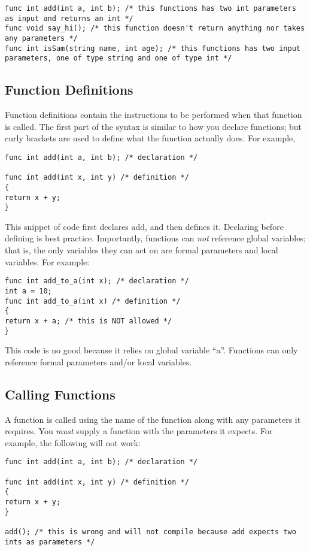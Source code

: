 \documentclass{article}
\begin{document}
\begin{lstlisting}
func int add(int a, int b); /* this functions has two int parameters as input and returns an int */
func void say_hi(); /* this function doesn't return anything nor takes any parameters */
func int isSam(string name, int age); /* this functions has two input parameters, one of type string and one of type int */

\end{lstlisting}

\subsection{Function Definitions}
Function definitions contain the instructions to be performed when that function is called. The first part of the syntax is similar to how you declare functions; but curly brackets are used to define what the function actually does. For example, 

\begin{lstlisting}
func int add(int a, int b); /* declaration */

func int add(int x, int y) /* definition */
{
return x + y;
}
\end{lstlisting}

This snippet of code first declares add, and then defines it. Declaring before defining is best practice. Importantly, functions can \emph{not} reference global variables; that is, the only variables they can act on are formal parameters and local variables. For example:

\begin{lstlisting}
func int add_to_a(int x); /* declaration */
int a = 10;
func int add_to_a(int x) /* definition */
{
return x + a; /* this is NOT allowed */
}
\end{lstlisting}

This code is no good because it relies on global variable ``a''. Functions can only reference formal parameters and/or local variables.

\subsection{Calling Functions}

A function is called using the name of the function along with any parameters it requires. You \emph{must} supply a function with the parameters it expects. For example, the following will not work:

\begin{lstlisting}
func int add(int a, int b); /* declaration */

func int add(int x, int y) /* definition */
{
return x + y;
}

add(); /* this is wrong and will not compile because add expects two ints as parameters */

\end{lstlisting}
\end{document}
